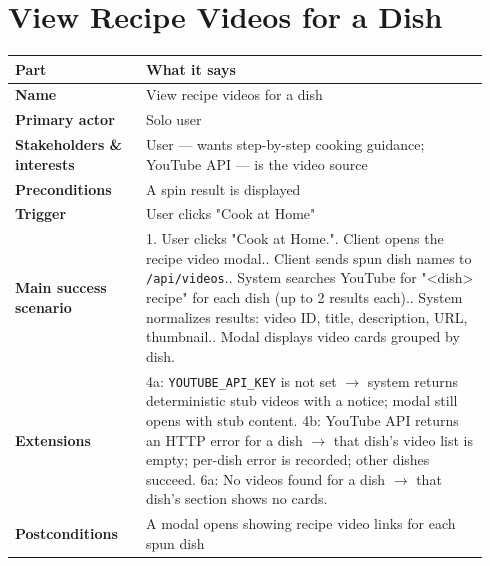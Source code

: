 \documentclass[11pt,twocolumn]{article}
\newcommand{\ucheader}{%
\textbf{Part} & \textbf{What it says} \\
\hline
\endhead
\hline
\endfoot
}
\begin{document}
\section{View Recipe Videos for a Dish}
{\footnotesize
\begin{longtable}{@{}p{0.26\linewidth}p{0.68\linewidth}@{}}
\hline
\ucheader
\textbf{Name} & View recipe videos for a dish \\
\hline
\textbf{Primary actor} & Solo user \\
\hline
\textbf{Stakeholders \& interests} & User --- wants step-by-step cooking guidance; YouTube API --- is the video source \\
\hline
\textbf{Preconditions} & A spin result is displayed \\
\hline
\textbf{Trigger} & User clicks "Cook at Home" \\
\hline
\textbf{Main success scenario} & 1. User clicks "Cook at Home."\newline
2. Client opens the recipe video modal.\newline
3. Client sends spun dish names to \texttt{/api/videos}.\newline
4. System searches YouTube for "<dish> recipe" for each dish (up to 2 results each).\newline
5. System normalizes results: video ID, title, description, URL, thumbnail.\newline
6. Modal displays video cards grouped by dish. \\
\hline
\textbf{Extensions} & 4a: \texttt{YOUTUBE\_API\_KEY} is not set $\rightarrow$ system returns deterministic stub videos with a notice; modal still opens with stub content.\newline
4b: YouTube API returns an HTTP error for a dish $\rightarrow$ that dish's video list is empty; per-dish error is recorded; other dishes succeed.\newline
6a: No videos found for a dish $\rightarrow$ that dish's section shows no cards. \\
\hline
\textbf{Postconditions} & A modal opens showing recipe video links for each spun dish \\
\hline
\end{longtable}
}
\end{document}
